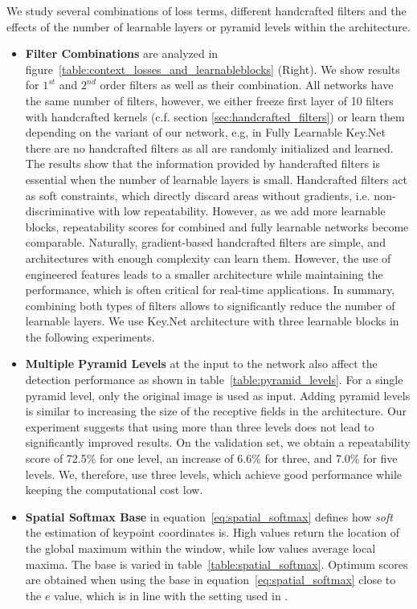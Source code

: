 \label{subsec:preliminary_analysis}
We study several combinations of loss terms, different handcrafted filters and the effects of the number of learnable layers or pyramid levels within the architecture.

\begin{itemize}
    \item \textbf{Filter Combinations} are analyzed in figure~\ref{table:context_losses_and_learnableblocks} (Right).
    We show results for $1^{st}$ and $2^{nd}$ order filters as well as their combination. All networks have the same number of filters, however, we either freeze first layer of 10 filters with handcrafted kernels (c.f. section \ref{sec:handcrafted_filters}) or learn them depending on the variant of our network, e.g, in Fully Learnable Key.Net there are no handcrafted filters as all are randomly initialized and learned. The results show that the information provided by handcrafted filters is essential when the number of learnable layers is small. Handcrafted filters act as soft constraints, which directly discard areas without gradients, i.e. non-discriminative with low repeatability. However, as we add more learnable blocks, repeatability scores for combined and fully learnable networks become comparable. Naturally, gradient-based handcrafted filters are simple, and architectures with enough complexity can learn them. However, the use of engineered features leads to a smaller architecture while maintaining the performance, which is often critical for real-time applications. In summary, combining both types of filters allows to significantly reduce the number of learnable layers. We use Key.Net architecture with three learnable blocks in the following experiments.
    \item \textbf{Multiple Pyramid Levels} at the input to the network also affect the detection performance as shown in table~\ref{table:pyramid_levels}. For a single pyramid level, only the original image is used as input. Adding pyramid levels is similar to increasing the size of the receptive fields in the architecture. Our experiment suggests that using more than three levels does not lead to significantly improved results. On the validation set, we obtain a repeatability score of 72.5\% for one level,  an increase of 6.6\% for three, and 7.0\% for five levels. We, therefore, use three levels, which achieve good performance while keeping the computational cost low.
    \item \textbf{Spatial Softmax Base} in equation~\ref{eq:spatial_softmax} defines how {\em soft} the estimation of keypoint coordinates  is. High values return the location of the global maximum within the window, while low values average local maxima. The base is varied in table~\ref{table:spatial_softmax}. Optimum scores are obtained when using the base in equation~\ref{eq:spatial_softmax}  close to the $e$ value, which is in line with the setting used in \cite{keypointnet_nips_18}.
\end{itemize}


